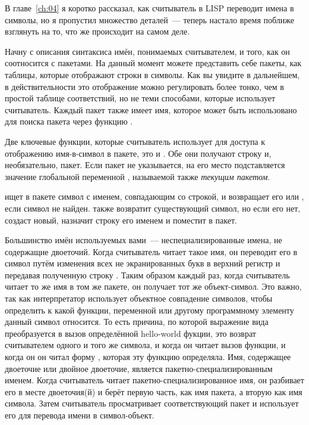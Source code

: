 В главе~\ref{ch:04} я коротко рассказал, как считыватель в LISP переводит имена в символы,
но я пропустил множество деталей~--- теперь настало время поближе взглянуть на то, что же
происходит на самом деле.

Начну с описания синтаксиса имён, понимаемых считывателем, и того, как он соотносится с
пакетами.  На данный момент можете представить себе пакеты, как таблицы, которые
отображают строки в символы. Как вы увидите в дальнейшем, в действительности это
отображение можно регулировать более тонко, чем в простой таблице соответствий, но не теми
способами, которые использует считыватель. Каждый пакет также имеет имя, которое может
быть использовано для поиска пакета через функцию .

Две ключевые функции, которые считыватель использует для доступа к отображению
имя-в-символ в пакете, это  и . Обе они получают строку и,
необязательно, пакет.  Если пакет не указывается, на его место подставляется значение
глобальной переменной , называемой также \textit{текущим пакетом}.

 ищет в пакете символ с именем, совпадающим со строкой, и возвращает его
или , если символ не найден.  также возвратит существующий символ,
но если его нет, создаст новый, назначит строку его именем и поместит в пакет.

Большинство имён используемых вами~--- неспециализированные имена, не содержащие
двоеточий. Когда считыватель читает такое имя, он переводит его в символ путём изменения
всех не экранированных букв в верхний регистр и передавая полученную строку .
Таким образом каждый раз, когда считыватель читает то же имя в том же пакете, он получает
тот же объект-символ. Это важно, так как интерпретатор использует объектное совпадение
символов, чтобы определить к какой функции, переменной или другому программному элементу
данный символ относится. То есть причина, по которой выражение вида 
преобразуется в вызов определённой hello-world фукции, это возврат считывателем одного и
того же символа, и когда он читает вызов функции, и когда он он читал форму ,
которая эту функцию определяла.  Имя, содержащее двоеточие или двойное двоеточие, является
пакетно-специализированным именем. Когда считыватель читает пакетно-специализированное
имя, он разбивает его в месте двоеточия(й) и берёт первую часть, как имя пакета, а вторую
как имя символа.  Затем считыватель просматривает соответствующий пакет и использует его
для перевода имени в символ-объект.

